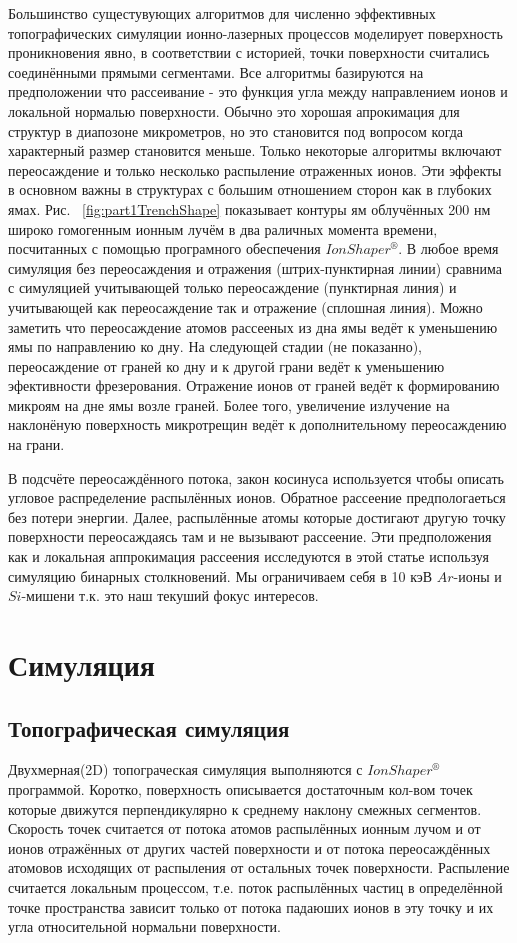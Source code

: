 \documentclass[a4paper,fontsize=12pt]{article}
\newcommand{\kev}{кэ\uppercase{В}}
\begin{document}
Большинство сущестувующих алгоритмов для численно эффективных топографических симуляции ионно-лазерных процессов моделирует поверхность проникновения явно, в соответствии с историей, точки поверхности считались соединёнными прямыми сегментами. Все алгоритмы базируются на предположении что рассеивание - это функция угла между направлением ионов и локальной нормалью поверхности. Обычно это хорошая апрокимация для структур в диапозоне микрометров, но это становится под вопросом когда характерный размер становится меньше. Только некоторые алгоритмы включают переосаждение и только несколько распыление отраженных ионов. Эти эффекты в основном важны в структурах с большим отношением сторон как в глубоких ямах. Рис. ~\ref{fig:part1TrenchShape} показывает контуры ям облучённых 200 нм широко гомогенным ионным лучём в два раличных момента времени, посчитанных с помощью програмного обеспечения $IonShaper^{®}$. В любое время симуляция без переосаждения и отражения (штрих-пунктирная линии) сравнима с симуляцией учитывающей только переосаждение (пунктирная линия) и учитывающей как переосаждение так и отражение (сплошная линия). Можно заметить что переосаждение атомов рассееных из дна ямы ведёт к уменьшению ямы по направлению ко дну. На следующей стадии (не показанно), переосаждение от граней ко дну и к другой грани ведёт к уменьшению эфективности фрезерования. Отражение ионов от граней ведёт к формированию микроям на дне ямы возле граней. Более того, увеличение излучение на наклонёную поверхность микротрещин ведёт к дополнительному переосаждению на грани.

В подсчёте переосаждённого потока, закон косинуса используется чтобы описать угловое распределение распылённых ионов. Обратное рассеение предпологаеться без потери энергии. Далее, распылённые атомы которые достигают другую точку поверхности переосаждаясь там и не вызывают рассеение. Эти предположения как и локальная аппрокимация рассеения исследуются в этой статье используя симуляцию бинарных столкновений. Мы ограничиваем себя в 10 \kev{} $Ar$-ионы и $Si$-мишени т.к. это наш текуший фокус интересов.

\section{Симуляция}
\subsection{Топографическая симуляция}

Двухмерная(2D) топограческая симуляция выполняются с $IonShaper^{®}$ программой. Коротко, поверхность описывается достаточным кол-вом точек которые движутся перпендикулярно к среднему наклону смежных сегментов. Скорость точек считается от потока атомов распылённых ионным лучом и от ионов отражённых от других частей поверхности и от потока переосаждённых атомовов исходящих от распыления от остальных точек поверхности. Распыление считается локальным процессом, т.е. поток распылённых частиц в определённой точке пространства зависит только от потока падаюших ионов в эту точку и их угла относительной нормальни поверхности.
\end{document}
